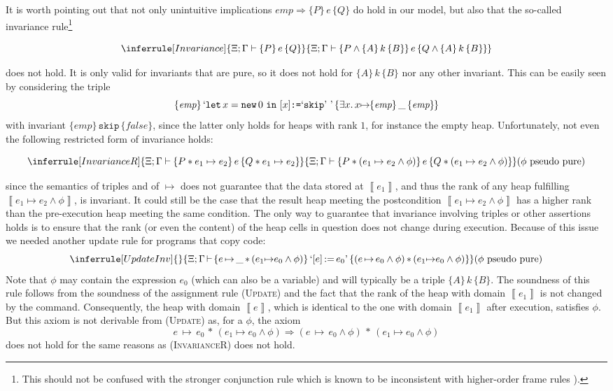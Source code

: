 \documentclass{LMCS}
\theoremstyle{remark}
\newcommand{\ALMOSTPURE}{\text{pseudo pure}\xspace}
\newcommand{\QUOTE}[1]{\textnormal{`\ensuremath{#1}'}}
\newcommand{\SYN}[1]{\ensuremath{\texttt{#1}}}
\newcommand{\triple}[3]{{\ensuremath{\!\left.\{ #1 \}\, #2\, \{  #3 \}\!\right.}}}
\newcommand{\False}{\ensuremath{\mathit{false}}}
\newcommand{\EMP}{\ensuremath{\textit{emp}}}
\newcommand{\den}[1]{\left\llbracket #1
  \right\rrbracket}
\newcommand{\X}{\ensuremath{\Xi}}
\begin{document}
 
 It is   worth pointing out that not only   unintuitive  implications $\EMP \Rightarrow \triple{P}{e}{Q}$ do hold in our model, but also that 
 the so-called invariance rule\footnote{This should not be confused with the stronger conjunction rule which is known to be inconsistent with higher-order frame rules \cite{OHearn:Yang:Reynolds:04}).}
 
 \[ 
\inferrule[Invariance]{ 
\X;\Gamma \adash \triple{P}{e}{Q}}
{ \X;\Gamma \adash \triple{P\wedge \triple{A}{k}{B}}{e}{Q\wedge \triple{A}{k}{B}}
}
\]

\noindent
does not hold. It is only valid  for invariants that are  pure, so it does  not hold for $\triple{A}{k}{B}$ nor any other \ALMOSTPURE invariant.
This can be easily seen by considering the triple
 $$\triple{\EMP}{\QUOTE{\SYN{let}\, x = \SYN{new}\, 0 \ \SYN{in}\ [x]\SYN{:=} \QUOTE{\SYN{skip}}\ }}{\exists x.\, x{\mapsto}\triple{\EMP}{\_}{\EMP}}$$
  with invariant  $\triple{\EMP}{\SYN{skip}}{\False}$, since the latter only holds for  heaps with rank $1$, for instance  the empty heap.
  Unfortunately, not even the following restricted form of invariance  holds:
 
  \[ 
\inferrule[InvarianceR]{ 
\X;\Gamma \adash \triple{P*e_1\mapsto e_2}{e}{Q * e_1\mapsto e_2}}
{ \X;\Gamma \adash \triple{P* (e_1\mapsto e_2 \wedge \phi)}{e}{Q * (e_1\mapsto e_2 \wedge \phi)} }(\mbox{$\phi$ \ALMOSTPURE})
\]

\noindent
since the semantics of triples and of $\mapsto$ does not guarantee that the data stored at $\den{e_1}$, and thus the rank of any heap fulfilling $\den{e_1\mapsto e_2 \wedge \phi}$, is invariant. It could still be the case that the result heap meeting the postcondition 
$\den{e_1\mapsto e_2 \wedge \phi}$ has a higher rank than the pre-execution heap  meeting the  same condition. 
The only way to guarantee that   invariance involving triples or other \ALMOSTPURE assertions holds is to ensure that the rank (or even the content) of the heap cells in question does not change during execution. 
Because of this issue we needed another update rule for programs that copy code:
\[ \inferrule[UpdateInv]{ 
}{
  \X;\Gamma\,{\adash}\,\triple{e\,{\mapsto}\,\_ \,{*}\, (e_1{\mapsto}e_0 \wedge \phi)}{\QUOTE{[e] \,{:=}\, e_0}}{(e\,{\mapsto}\,e_0\wedge  \phi) \,{*}\, (e_1{\mapsto}e_0 \wedge \phi) }
}(\mbox{$\phi$ \ALMOSTPURE})
\] 
\noindent
Note that $\phi$ may contain the expression $e_0$ (which can also be a variable) and will typically be a triple $\triple{A}{k}{B}$. The soundness of this rule follows from the soundness of  the assignment rule (\textsc{Update}) and the fact that the rank of the heap with domain $\den{e_1}$ is not changed by the command. Consequently,  the heap with domain $\den{e}$, which is identical to the one with domain $\den{e_1}$ after execution, satisfies $\phi$. But this axiom is not derivable from (\textsc{Update}) as, for a \ALMOSTPURE $\phi$, the axiom
\[
{e\,{\mapsto}\,e_0 \,{*}\, (e_1{\mapsto}e_0 \wedge \phi)} \Rightarrow
{(e\,{\mapsto}\,e_0 \wedge \phi) \,{*}\, (e_1{\mapsto}e_0 \wedge \phi)}  \]
does not hold for the same reasons as (\textsc{InvarianceR}) does not hold.
\end{document}
